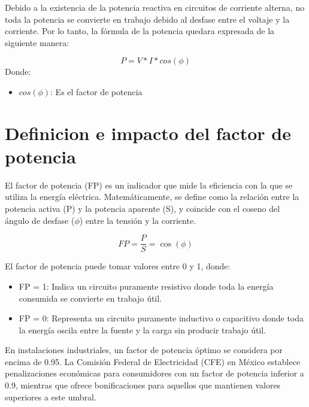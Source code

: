 \documentclass{report}          %
\begin{document}
            Debido a la existencia de la potencia reactiva en circuitos de corriente alterna, no toda la potencia se convierte en trabajo debido al desfase entre el voltaje y la corriente. Por lo tanto, la fórmula de la potencia quedara expresada de la siguiente manera:

            \begin{equation}
                P=V*I*cos(\phi)
            \end{equation}
            Donde:
            \begin{itemize}
                \item $cos(\phi)$: Es el factor de potencia
            \end{itemize}
        
        \section{Definicion e impacto del factor de potencia}
            El factor de potencia (FP) es un indicador que mide la eficiencia con la que se utiliza la energía eléctrica. Matemáticamente, se define como la relación entre la potencia activa (P) y la potencia aparente (S), y coincide con el coseno del ángulo de desfase ($\phi$) entre la tensión y la corriente.

            \begin{equation}
                FP = \frac{P}{S} = \cos(\phi)
            \end{equation}

            El factor de potencia puede tomar valores entre 0 y 1, donde:
            \begin{itemize}
                \item FP = 1: Indica un circuito puramente resistivo donde toda la energía consumida se convierte en trabajo útil.
                \item FP = 0: Representa un circuito puramente inductivo o capacitivo donde toda la energía oscila entre la fuente y la carga sin producir trabajo útil.
            \end{itemize}
        
            En instalaciones industriales, un factor de potencia óptimo se considera por encima de 0.95. La Comisión Federal de Electricidad (CFE) en México establece penalizaciones económicas para consumidores con un factor de potencia inferior a 0.9, mientras que ofrece bonificaciones para aquellos que mantienen valores superiores a este umbral.
\end{document}
